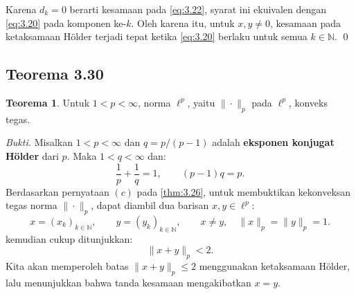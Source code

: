 \documentclass[aspectratio=169,11pt]{beamer}
\theoremstyle{definition}
\newtheorem{teorema}{Teorema}
\newcommand{\myref}[1]{\hyperref[#1]{\nameCref{#1} \ref*{#1}}}
\newcommand{\N}{\mathbb{N}}
\begin{document}
\begin{frame}[allowframebreaks=1]{\insertsection}{\insertsubsection}
\begin{enumerate}
          Karena $d_k=0$ berarti kesamaan pada \eqref{eq:3.22}, syarat ini ekuivalen dengan \eqref{eq:3.20} pada komponen ke-$k$. Oleh karena itu, untuk $x,y\neq 0$, kesamaan pada ketaksamaan H\"older terjadi tepat ketika \eqref{eq:3.20} berlaku untuk semua $k\in\N$. \qed
  \end{enumerate}
\end{frame}

\subsection{Teorema 3.30}

\begin{frame}[allowframebreaks]{\insertsection}{\insertsubsection}
  \setcounter{teorema}{29}
  \begin{teorema}
    Untuk $1<p<\infty$, norma $\ell^p$, yaitu $\|\cdot\|_p$ pada $\ell^p$, konveks tegas.\label{thm:3.30}
  \end{teorema}
  \textit{Bukti.}
  Misalkan $1<p<\infty$ dan $q=p/(p-1)$ adalah \textbf{eksponen konjugat H\"older} dari $p$. Maka $1<q<\infty$ dan:
  \begin{equation*}
    \frac{1}{p}+\frac{1}{q}=1, \qquad (p-1)q=p.
  \end{equation*}
  Berdasarkan pernyataan $(c)$ pada \myref{thm:3.26}, untuk membuktikan kekonveksan tegas norma $\|\cdot\|_p$, dapat diambil dua barisan $x,y\in\ell^p$:
  \begin{equation*}
    x=(x_k)_{k\in\N},\qquad y=(y_k)_{k\in\N},
    \qquad x\neq y,\quad \|x\|_p=\|y\|_p=1.
  \end{equation*}
  kemudian cukup ditunjukkan:
  \setcounter{equation}{24}
  \begin{equation}
    \|x+y\|_p<2. \label{eq:3.25}
  \end{equation}
  Kita akan memperoleh batas $\|x+y\|_p\leq 2$ menggunakan ketaksamaan H\"older, lalu menunjukkan bahwa tanda kesamaan mengakibatkan $x=y$.



\end{frame}
\end{document}

